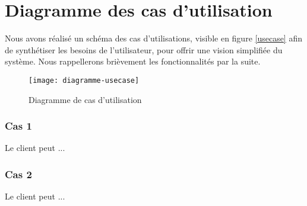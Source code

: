 \section{Diagramme des cas d'utilisation}

Nous avons réalisé un schéma des cas d'utilisations, visible en figure \vref{usecase} afin de synthétiser les besoins de l'utilisateur, pour offrir une vision simplifiée du système. Nous rappellerons brièvement les fonctionnalités par la suite.

\begin{figure}[h]
\begin{center}
    \texttt{[image: diagramme-usecase]}
\end{center}
    \caption{Diagramme de cas d'utilisation}
    \label{usecase}                      
\end{figure}

\subsubsection{Cas 1}

Le client peut ...

\subsubsection{Cas 2}

Le client peut ...